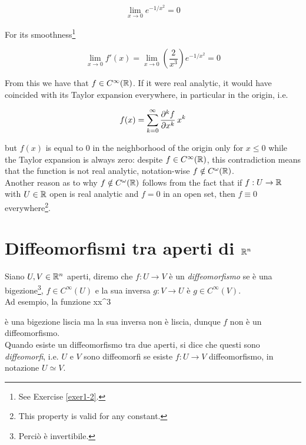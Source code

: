 \begin{equation}
	\lim_{x \to 0} e^{-1/x^{2}} = 0
\end{equation}

For its smoothness\footnote{%
	See Exercise \ref{exer1-2}.}

\begin{equation}
	\lim_{x \to 0} f' (x) = \lim_{x \to 0} \left(\dfrac{2}{x^{3}}\right) e^{-1/x^{2}} = 0
\end{equation}

From this we have that $ f \in C^{\infty}(\mathbb{R}) $. If it were real analytic, it would have coincided with its Taylor expansion everywhere, in particular in the origin, i.e.

\begin{align}
	\begin{split}
		f(x) = \sum_{k=0}^{\infty} \pdv[k]{f}{x} (0) \, x^{k}
	\end{split}
\end{align}

but $ f(x) $ is equal to 0 in the neighborhood of the origin only for $ x \leqslant 0 $ while the Taylor expansion is always zero: despite $ f \in C^{\infty}(\mathbb{R}) $, this contradiction means that the function is not real analytic, notation-wise $ f \notin C^{\omega}(\mathbb{R}) $. \\
Another reason as to why $ f \notin C^{\omega}(\mathbb{R}) $ follows from the fact that if $ f : U \to \mathbb{R} $ with $ U \in \mathbb{R} $ open is real analytic and $ f = 0 $ in an open set, then $ f \equiv 0 $ everywhere\footnote{%
	This property is valid for any constant.%
}.

\section{Diffeomorfismi tra aperti di $ \mathbb{R}^{n} $}

Siano $ U, V \in \mathbb{R}^{n} $ aperti, diremo che $ f : U \to V $ è un \textit{diffeomorfismo} se è una bigezione\footnote{%
	Perciò è invertibile.%
}, $ f \in C^{\infty}(U) $ e la sua inversa $ g : V \to U $ è  $ g \in C^{\infty}(V) $. \\
Ad esempio, la funzione
%
	{\R}{\R}
	{x}{x^{3}}

è una bigezione liscia ma la sua inversa non è liscia, dunque $ f $ non è un diffeomorfismo. \\
Quando esiste un diffeomorfismo tra due aperti, si dice che questi sono \textit{diffeomorfi}, i.e. $ U $ e $ V $ sono diffeomorfi se esiste $ f : U \to V $ diffeomorfismo, in notazione $ U \simeq V $. \\

